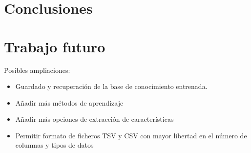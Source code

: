 
\chapter{Conclusiones}

\chapter{Trabajo futuro}

Posibles ampliaciones:

\begin{itemize}
\item Guardado y recuperación de la base de conocimiento entrenada.
\item Añadir más métodos de aprendizaje
\item Añadir más opciones de extracción de características
\item Permitir formato de ficheros TSV y CSV con mayor libertad en el número de columnas y tipos de datos
\end{itemize}
